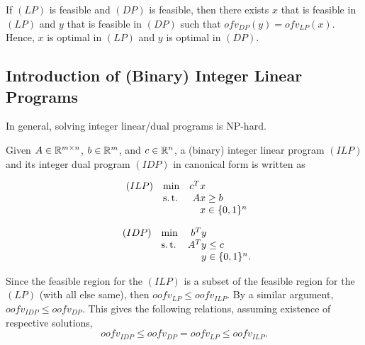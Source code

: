 \begin{thm}
    \label{thm:strong-duality-LP}
    If $(LP)$ is feasible and $(DP)$ is feasible, then there exists $x$ that is feasible in $(LP)$ and $y$ that is feasible in $(DP)$ such that $ofv_{DP}(y) = ofv_{LP}(x)$. Hence, $x$ is optimal in $(LP)$ and $y$ is optimal in $(DP)$.
\end{thm}


\subsection{Introduction of (Binary) Integer Linear Programs}
\label{subsec:introduction-of-ilps}

In general, solving integer linear/dual programs is NP-hard.

\begin{defn}
    \label{def:integer-linear/dual-program}
    Given $A \in \mathbb R^{m \times n}$, $b \in \mathbb R^m$, and $c \in \mathbb R^n$, a (binary) integer linear program $(ILP)$ and its integer dual program $(IDP)$ in canonical form is written as
    \begin{multicols}{2}
        \noindent
        \begin{equation*}
        \begin{array}{llr@{}l@{}}
            (ILP)   & \min  & c^T x &                   \\
                    & \st   & Ax    & {}\ge b           \\
                    &       &  x    & {}\in \{0, 1\}^n
        \end{array}
        \end{equation*}
        
        \noindent
        \begin{equation*}
        \begin{array}{llr@{}l@{}}
            (IDP)   & \min  & b^T y &                   \\
                    & \st   & A^T y & {}\le c           \\
                    &       &  y    & {}\in \{0, 1\}^n.
        \end{array}
        \end{equation*}
    \end{multicols}
\end{defn}

\begin{rmk}
    \label{rmk:ilp-lp-inequalities}
    Since the feasible region for the $(ILP)$ is a subset of the feasible region for the $(LP)$ (with all else same), then $oofv_{LP} \le oofv_{ILP}$. By a similar argument, $oofv_{IDP} \le oofv_{DP}$. This gives the following relations, assuming existence of respective solutions,
    \[
        oofv_{IDP} \le oofv_{DP} = oofv_{LP} \le oofv_{ILP}.
    \]
\end{rmk}

